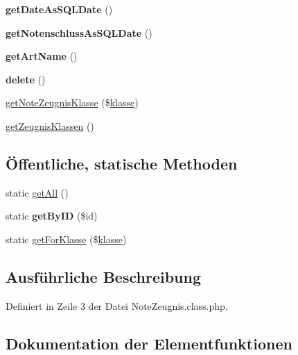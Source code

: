 \begin{DoxyCompactItemize}
{\bfseries get\+Date\+As\+S\+Q\+L\+Date} ()
\item 
\mbox{\label{class_note_zeugnis_adebb11e2f93e2419d67854d90a15d601}} 
{\bfseries get\+Notenschluss\+As\+S\+Q\+L\+Date} ()
\item 
\mbox{\label{class_note_zeugnis_a10c6c0949c31f6bb90001b5272efab96}} 
{\bfseries get\+Art\+Name} ()
\item 
\mbox{\label{class_note_zeugnis_a450e1fe9f0eee180076317fbcfde02aa}} 
{\bfseries delete} ()
\item 
\mbox{\hyperlink{class_note_zeugnis_a6d02250befec2fa882cd4c637e25653b}{get\+Note\+Zeugnis\+Klasse}} (\$\mbox{\hyperlink{classklasse}{klasse}})
\item 
\mbox{\hyperlink{class_note_zeugnis_a6be0a92e83ebe2d7a8ad0a64c81ce001}{get\+Zeugnis\+Klassen}} ()
\end{DoxyCompactItemize}
\subsection*{Öffentliche, statische Methoden}
\begin{DoxyCompactItemize}
\item 
static \mbox{\hyperlink{class_note_zeugnis_a48ee539edd9233472e481d6c654c1caa}{get\+All}} ()
\item 
\mbox{\label{class_note_zeugnis_a45dc1673170e2df9b8873ed767aef96b}} 
static {\bfseries get\+By\+ID} (\$id)
\item 
static \mbox{\hyperlink{class_note_zeugnis_adb57787364e9be6143b59674a0cac12d}{get\+For\+Klasse}} (\$\mbox{\hyperlink{classklasse}{klasse}})
\end{DoxyCompactItemize}


\subsection{Ausführliche Beschreibung}


Definiert in Zeile 3 der Datei Note\+Zeugnis.\+class.\+php.



\subsection{Dokumentation der Elementfunktionen}
\mbox{\label{class_note_zeugnis_a48ee539edd9233472e481d6c654c1caa}} 

